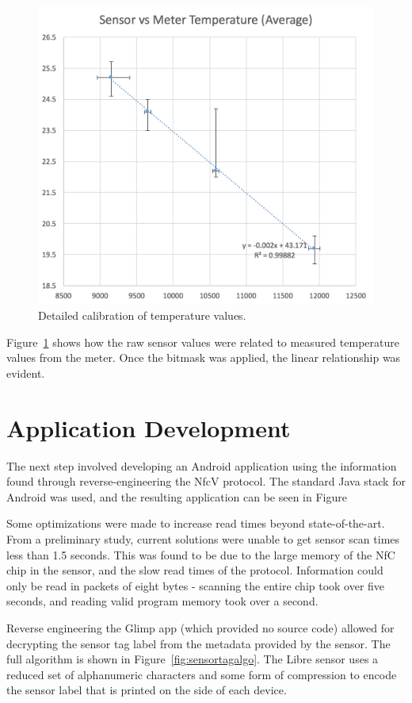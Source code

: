 \begin{figure}[ht]
\centering\includegraphics[width=0.75\linewidth]{images/tempcal2.png}
\caption{Detailed calibration of temperature values.}
\label{fig:tempcal2}
\end{figure}

Figure~\ref{fig:tempcal2} shows how the raw sensor values were related to measured temperature values from the meter. Once the bitmask was applied, the linear relationship was evident.

\section{Application Development}

The next step involved developing an Android application using the information found through reverse-engineering the NfcV protocol. The standard Java stack for Android was used, and the resulting application can be seen in Figure

Some optimizations were made to increase read times beyond state-of-the-art. From a preliminary study, current solutions were unable to get sensor scan times less than 1.5 seconds. This was found to be due to the large memory of the NfC chip in the sensor, and the slow read times of the protocol. Information could only be read in packets of eight bytes - scanning the entire chip took over five seconds, and reading valid program memory took over a second.

Reverse engineering the Glimp app (which provided no source code) allowed for decrypting the sensor tag label from the metadata provided by the sensor. The full algorithm is shown in Figure~\ref{fig:sensortagalgo}. The Libre sensor uses a reduced set of alphanumeric characters and some form of compression to encode the sensor label that is printed on the side of each device.

